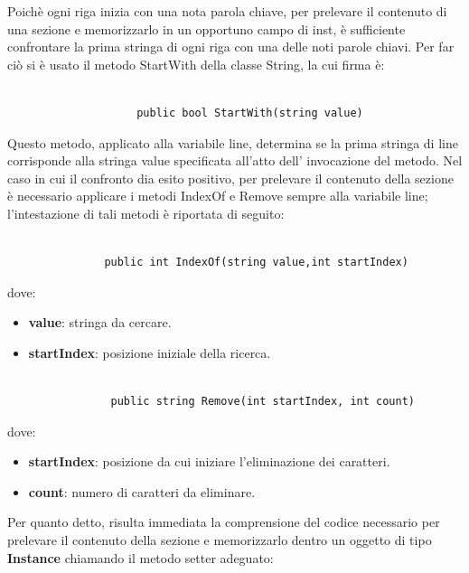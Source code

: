 \documentclass[11pt]{article}
\begin{document}
Poichè ogni riga inizia con una nota parola chiave, per prelevare il contenuto di una sezione e memorizzarlo in un opportuno campo di inst, è sufficiente confrontare la prima stringa di ogni riga con una delle noti parole chiavi. Per far ciò si è  usato il metodo StartWith della classe String, la cui firma è:

\begin{lstlisting}

                    public bool StartWith(string value)

\end{lstlisting}

Questo metodo, applicato alla variabile line, determina se la prima stringa di line corrisponde alla stringa value specificata all'atto dell' invocazione del metodo. Nel caso in cui il confronto dia esito positivo, per prelevare il contenuto della sezione è necessario applicare i metodi IndexOf e Remove sempre alla variabile line; l'intestazione di tali metodi è riportata di seguito:


\begin{lstlisting}

               public int IndexOf(string value,int startIndex)

\end{lstlisting}

dove:

\begin{itemize}
    \item \textbf{value}: stringa da cercare.
    \item \textbf{startIndex}: posizione iniziale della ricerca.
\end{itemize}

\begin{lstlisting}

                public string Remove(int startIndex, int count)

\end{lstlisting}


dove:

\begin{itemize}
    \item \textbf{startIndex}: posizione da cui iniziare l'eliminazione dei caratteri.
    \item \textbf{count}: numero di caratteri da eliminare.
\end{itemize}

Per quanto detto, risulta immediata la comprensione del codice necessario per prelevare il contenuto della sezione e memorizzarlo dentro un oggetto di tipo \textbf{Instance} chiamando il metodo setter adeguato:
\end{document}
